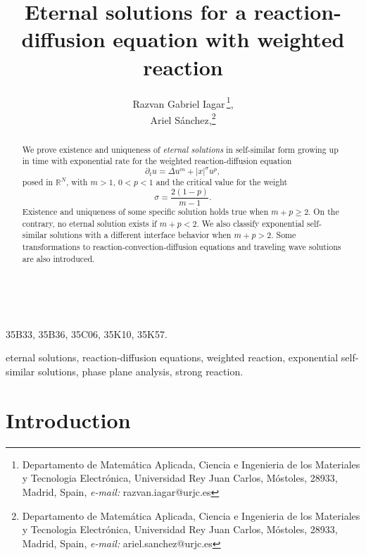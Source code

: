\documentclass[a4paper,11pt]{article}
\numberwithin{equation}{section}
\newcommand{\real}{\mathbb{R}}
\begin{document}

\title{\huge \bf Eternal solutions for a reaction-diffusion equation with weighted reaction}

\author{
\Large Razvan Gabriel Iagar\,\footnote{Departamento de Matem\'{a}tica
Aplicada, Ciencia e Ingenieria de los Materiales y Tecnologia
Electr\'onica, Universidad Rey Juan Carlos, M\'{o}stoles,
28933, Madrid, Spain, \textit{e-mail:} razvan.iagar@urjc.es},
\\[4pt] \Large Ariel S\'{a}nchez,\footnote{Departamento de Matem\'{a}tica
Aplicada, Ciencia e Ingenieria de los Materiales y Tecnologia
Electr\'onica, Universidad Rey Juan Carlos, M\'{o}stoles,
28933, Madrid, Spain, \textit{e-mail:} ariel.sanchez@urjc.es}\\
[4pt] }
\date{}
\maketitle

\begin{abstract}
We prove existence and uniqueness of \emph{eternal solutions} in self-similar form growing up in time with exponential rate for the weighted reaction-diffusion equation
$$
\partial_tu=\Delta u^m+|x|^{\sigma}u^p,
$$
posed in $\real^N$, with $m>1$, $0<p<1$ and the critical value for the weight
$$
\sigma=\frac{2(1-p)}{m-1}.
$$
Existence and uniqueness of some specific solution holds true when $m+p\geq2$. On the contrary, no eternal solution exists if $m+p<2$. We also classify exponential self-similar solutions with a different interface behavior when $m+p>2$. Some transformations to reaction-convection-diffusion equations and traveling wave solutions are also introduced.
\end{abstract}

\

 35B33, 35B36, 35C06,
35K10, 35K57.

\smallskip

 eternal solutions, reaction-diffusion equations,
weighted reaction, exponential self-similar solutions, phase plane analysis, strong reaction.

\section{Introduction}
\end{document}
